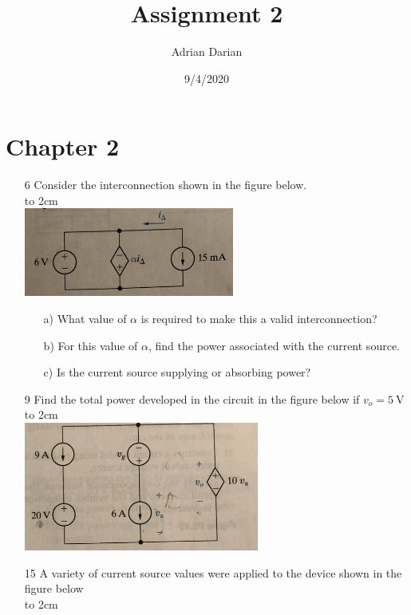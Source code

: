 \documentclass[a4paper]{article}
\title{Assignment 2}
\author{Adrian Darian}
\date{9/4/2020}
\begin{document}
  
\maketitle
  
\section*{Chapter 2}
\begin{itemize}
	\item[6] Consider the interconnection shown in the figure below. \\
	      \hbox to 2cm{} \\	  
	      \includegraphics{P2-6.png} \\ 
	      \begin{itemize}
	      	\item[a)] What value of $\alpha$ is required to make this a valid interconnection?
	      	\item[b)] For this value of $\alpha$, find the power associated with the current source.
	      	\item[c)] Is the current source supplying or absorbing power?
	      \end{itemize} 
	\item[9] Find the total power developed in the circuit in the figure below if $v_{o} = \SI{5}{\volt}$ \\
	      \hbox to 2cm{} \\	  
	      \includegraphics{P2-9.png} \\
	\item[15] A variety of current source values were applied to the device shown in the figure below \\
	      \hbox to 2cm{} \\	 

\end{itemize}
\end{document}
